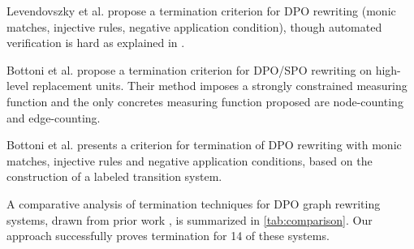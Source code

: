 Levendovszky et al. \cite{levendovszky2007termination} propose a termination criterion for DPO rewriting (monic matches, injective rules, negative application condition), though automated verification is hard as explained in \cite[]{levendovszky2007termination}. 

Bottoni et al. \cite{bottoni2005termination} propose a termination criterion for DPO/SPO rewriting on high-level replacement units. Their method imposes a strongly constrained measuring function and the only concretes measuring function proposed are node-counting and edge-counting.

Bottoni et al. \cite{bottoni2010atermination} presents a criterion for termination of DPO rewriting with monic matches, injective rules and negative application conditions, based on the construction of a labeled transition system. 

A comparative analysis of termination techniques for DPO graph rewriting systems, drawn from prior work \cite{plump1995ontermination,plump2018modular,bruggink2014termination,bruggink2015proving,endrullis2024generalized_arxiv_v2,overbeek2024termination_lmcs}, is summarized in \autoref{tab:comparison}. Our approach successfully proves termination for 14 of these systems.
